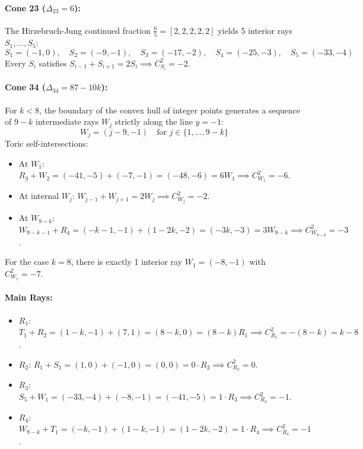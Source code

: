 \documentclass[11pt, reqno]{amsart}
\theoremstyle{definition}
\begin{document}
\paragraph{Cone 23 ($\Delta_{23} = 6$):} 
The Hirzebruch-Jung continued fraction $\frac{6}{5} = [2,2,2,2,2]$ yields 5 interior rays $S_1, \dots, S_5$:
\begin{equation}
    S_1 = (-1, 0), \quad S_2 = (-9, -1), \quad S_3 = (-17, -2), \quad S_4 = (-25, -3), \quad S_5 = (-33, -4)
\end{equation}
Every $S_i$ satisfies $S_{i-1} + S_{i+1} = 2 S_i \implies C_{S_i}^2 = -2$.

\paragraph{Cone 34 ($\Delta_{34} = 87 - 10k$):} 
For $k < 8$, the boundary of the convex hull of integer points generates a sequence of $9-k$ intermediate rays $W_j$ strictly along the line $y = -1$:
\begin{equation}
    W_j = (j-9, -1) \quad \text{for } j \in \{1, \dots, 9-k\}
\end{equation}
Toric self-intersections:
\begin{itemize}
    \item At $W_1$: $R_3 + W_2 = (-41, -5) + (-7, -1) = (-48, -6) = 6 W_1 \implies C_{W_1}^2 = -6$.
    \item At internal $W_j$: $W_{j-1} + W_{j+1} = 2 W_j \implies C_{W_j}^2 = -2$.
    \item At $W_{9-k}$: $W_{9-k-1} + R_4 = (-k-1, -1) + (1-2k, -2) = (-3k, -3) = 3 W_{9-k} \implies C_{W_{9-k}}^2 = -3$.
\end{itemize}
For the case $k=8$, there is exactly 1 interior ray $W_1 = (-8, -1)$ with $C_{W_1}^2 = -7$.

\paragraph{Main Rays:}
\begin{itemize}
    \item $R_1$: $T_1 + R_2 = (1-k, -1) + (7, 1) = (8-k, 0) = (8-k) R_1 \implies C_{R_1}^2 = -(8-k) = k-8$.
    \item $R_2$: $R_1 + S_1 = (1, 0) + (-1, 0) = (0, 0) = 0 \cdot R_2 \implies C_{R_2}^2 = 0$.
    \item $R_3$: $S_5 + W_1 = (-33, -4) + (-8, -1) = (-41, -5) = 1 \cdot R_3 \implies C_{R_3}^2 = -1$.
    \item $R_4$: $W_{9-k} + T_1 = (-k, -1) + (1-k, -1) = (1-2k, -2) = 1 \cdot R_4 \implies C_{R_4}^2 = -1$.
\end{itemize}
\end{document}
